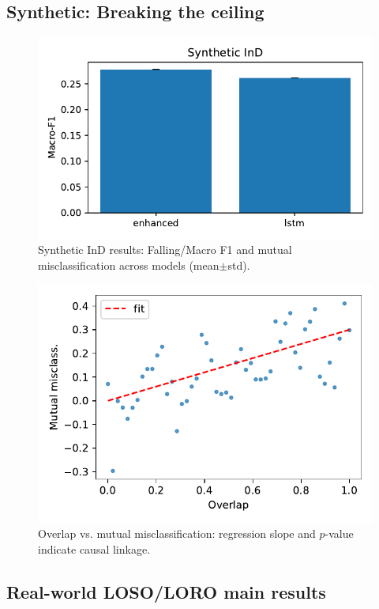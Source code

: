 \documentclass[10pt,conference]{IEEEtran}
\begin{document}
\subsection{Synthetic: Breaking the ceiling}
\begin{figure}[t]
  \centering
  \includegraphics[width=\linewidth]{../plots/fig_synth_bars.pdf}
  \caption{Synthetic InD results: Falling/Macro F1 and mutual misclassification across models (mean$\pm$std).}
  \label{fig:synth-bars}
\end{figure}
\begin{figure}[t]
  \centering
  \includegraphics[width=\linewidth]{../plots/fig_overlap_scatter.pdf}
  \caption{Overlap vs. mutual misclassification: regression slope and $p$-value indicate causal linkage.}
  \label{fig:overlap-scatter}
\end{figure}

\subsection{Real-world LOSO/LORO main results}

\end{document}
